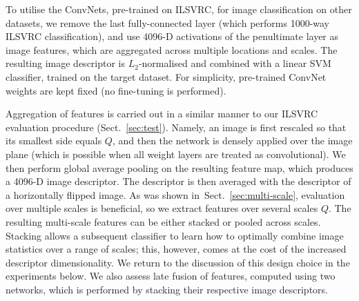 \documentclass{article} %
\makeatletter
\newcommand{\sref}[1]{Sect.~\ref{#1}}
\newcommand*{\eg}{e.g.\@\xspace}
\makeatother
\begin{document}
To utilise the ConvNets, pre-trained on ILSVRC, for image classification on other datasets, we remove the last fully-connected layer (which performs 1000-way ILSVRC classification), and use 4096-D activations of the penultimate layer as image features, which are aggregated across multiple locations and scales. The resulting image descriptor is $L_2$-normalised and combined with a linear SVM classifier, trained on the target dataset. For simplicity, pre-trained ConvNet weights are kept fixed (no fine-tuning is performed). 

Aggregation of features is carried out in a similar manner to our ILSVRC evaluation procedure (\sref{sec:test}). Namely, an image is first rescaled so that its smallest side equals $Q$, and then the network is densely applied over the image plane (which is possible when all weight layers are treated as convolutional). We then perform global average pooling on the resulting feature map, which produces a 4096-D image descriptor. The descriptor is then averaged with the descriptor of a horizontally flipped image.
As was shown in~\sref{sec:multi-scale}, evaluation over multiple scales is beneficial, so we extract features over several scales $Q$.
The resulting multi-scale features can be either stacked or pooled across scales.
Stacking allows a subsequent classifier to learn how to optimally combine image statistics over a range of scales; this, however, comes at the cost of the increased descriptor dimensionality.
We return to the discussion of this design choice in the experiments below.
We also assess late fusion of features, computed using two networks, which is performed by stacking their respective image descriptors.

\end{document}
